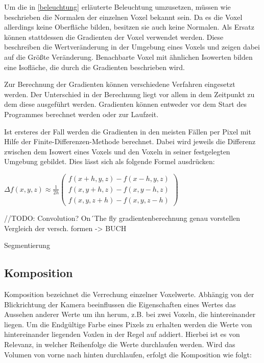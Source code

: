 Um die in \ref{beleuchtung} erläuterte Beleuchtung umzusetzen, müssen wie beschrieben die Normalen der einzelnen Voxel bekannt sein. Da es die Voxel allerdings keine Oberfläche bilden, besitzen sie auch keine Normalen. Als Ersatz können stattdessen die Gradienten der Voxel verwendet werden. Diese beschreiben die Wertveränderung in der Umgebung eines Voxels und zeigen dabei auf die Größte Veränderung. Benachbarte Voxel mit ähnlichen Isowerten bilden eine Isofläche, die durch die Gradienten beschrieben wird. 

Zur Berechnung der Gradienten können verschiedene Verfahren eingesetzt werden. Der Unterschied in der Berechnung liegt vor allem in dem Zeitpunkt zu dem diese ausgeführt werden. Gradienten können entweder vor dem Start des Programmes berechnet werden oder zur Laufzeit. 

Ist ersteres der Fall werden die Gradienten in den meisten Fällen per Pixel mit Hilfe der Finite-Differenzen-Methode berechnet. 
Dabei wird jeweils die Differenz zwischen dem Isowert eines Voxels und den Voxeln in seiner festgelegten Umgebung gebildet. Dies lässt sich als folgende Formel ausdrücken: 

$
\Delta f(x,y,z)\approx \frac{1}{2h}
\left ( \begin{matrix}
f(x + h, y, z) - f(x - h, y, z)\\ 
f(x, y + h, z) - f(x, y - h, z)\\ 
f(x, y, z + h) - f(x, y, z - h)
\end{matrix} \right )
$

//TODO:
Convolution?
On´The fly gradientenberechnung
genau vorstellen
Vergleich der versch. formen -> BUCH

Segmentierung

\subsection{Komposition}

Komposition bezeichnet die Verrechung einzelner Voxelwerte. Abhängig von der Blickrichtung der Kamera beeinflussen die Eigenschaften eines Wertes das Aussehen anderer Werte um ihn herum, z.B. bei zwei Voxeln, die hintereinander liegen. Um die Endgültige Farbe eines Pixels zu erhalten werden die Werte von hintereinander liegenden Voxlen in der Regel auf addiert. Hierbei ist es von Relevanz, in welcher Reihenfolge die Werte durchlaufen werden. Wird das Volumen von vorne nach hinten durchlaufen, erfolgt die Komposition wie folgt:

